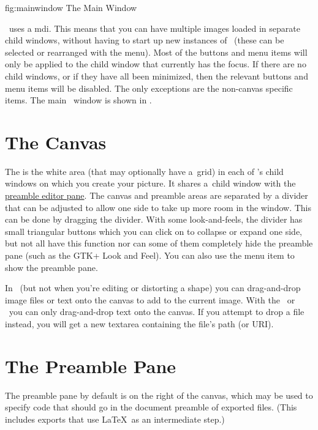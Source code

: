 \FloatFig
  {fig:mainwindow}
  {}
  {The Main Window}

\FlowframTk\ uses a \gls{mdi}. This means that you can have multiple
images loaded in separate child windows, without having to start up
new instances of \FlowframTk\ (these can be selected or rearranged
with the  menu). Most of the buttons and menu items
will only be applied to the child window that currently has the
focus. If there are no child windows, or if they have all been
minimized, then the relevant buttons and menu items will be disabled.
The only exceptions are the non-\gls{canvas} specific items.
The main \FlowframTk\ window is shown in .

\section{The Canvas}\label{sec:thecanvas}

The  is the white area (that may optionally
have a~grid) in each of \FlowframTk's child windows on which you create
your picture. It shares a~child window with the
\hyperref[sec:thepreamblepane]{preamble editor pane}. The canvas and
preamble areas are separated by a divider that can be adjusted to
allow one side to take up more room in the window. This can be done
by dragging the divider.  With some \glspl{look-and-feel}, the
divider has small triangular buttons which you can click on to
collapse or expand one side, but not all have this function nor can
some of them completely hide the \gls{preamble} pane (such as the GTK+
Look and Feel).  You can also use the  menu
item to show the preamble pane.

In \selectmode\ (but not when you're editing or
distorting a shape) you can \gls{drag-and-drop} image files or
text onto the canvas to add to the current image. With the
\texttool\ or \mathstool\ you can only \gls{drag-and-drop} text onto
the canvas. If you attempt to drop a file instead, you will get a
new \gls{textarea} containing the file's path (or URI). 

\section{The Preamble Pane}\label{sec:thepreamblepane}

The preamble pane by default is on the right of the \gls{canvas},
which may be used to specify code that should go in the document
preamble of exported files. (This includes exports that use \LaTeX\
as an intermediate step.)

